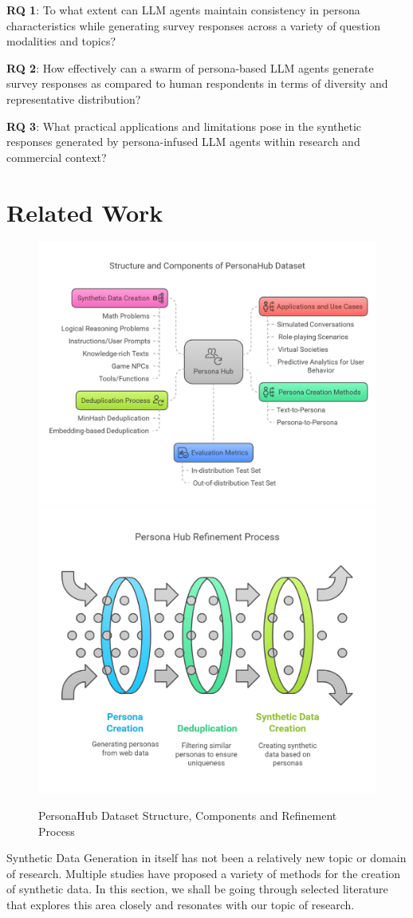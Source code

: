 \documentclass[11pt]{article}
\begin{document}
\textbf{RQ 1}: To what extent can LLM agents maintain consistency in persona characteristics while generating survey responses across a variety of question modalities and topics?

\textbf{RQ 2}: How effectively can a swarm of persona-based LLM agents generate survey responses as compared to human respondents in terms of diversity and representative distribution?

\textbf{RQ 3}: What practical applications and limitations pose in the synthetic responses generated by persona-infused LLM agents within research and commercial context? 

\section{Related Work}
\begin{figure}[t]
  \includegraphics[width=0.48\linewidth]{latex/assets/Structure and Components of PersonaHub Dataset.png} \hfill
  \includegraphics[width=0.48\linewidth]{latex/assets/PersonaHub Refinement Process.png}
  \caption {PersonaHub Dataset Structure, Components and Refinement Process}
\end{figure}
Synthetic Data Generation in itself has not been a relatively new topic or domain of research. Multiple studies have proposed a variety of methods for the creation of synthetic data. In this section, we shall be going through selected literature that explores this area closely and resonates with our topic of research.
\end{document}

